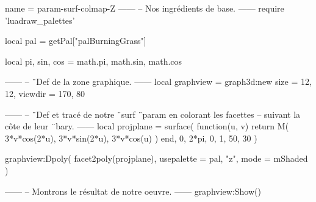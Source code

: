 \documentclass{standalone}
\begin{document}
\begin{luadraw}{name = param-surf-colmap-Z}
------
-- Nos ingrédients de base.
------
require 'luadraw_palettes'

local pal = getPal["palBurningGrass"]

local pi, sin, cos = math.pi, math.sin, math.cos

------
-- ¨Def de la zone graphique.
------
local graphview = graph3d:new{
  size    = {12, 12},
  viewdir = {170, 80}
}

------
-- ¨Def et tracé de notre ¨surf ¨param en colorant les facettes
-- suivant la côte de leur ¨bary.
------
local projplane = surface(
  function(u, v)
    return M(
      3*v*cos(2*u),
      3*v*sin(2*u),
      3*v*cos(u)
    )
  end,
  0, 2*pi, 0, 1,
  {50, 30}
)

graphview:Dpoly(
  facet2poly(projplane),
  {
    usepalette = {pal, "z"},
    mode       = mShaded
  }
)

------
-- Montrons le résultat de notre oeuvre.
------
graphview:Show()
\end{luadraw}
\end{document}
